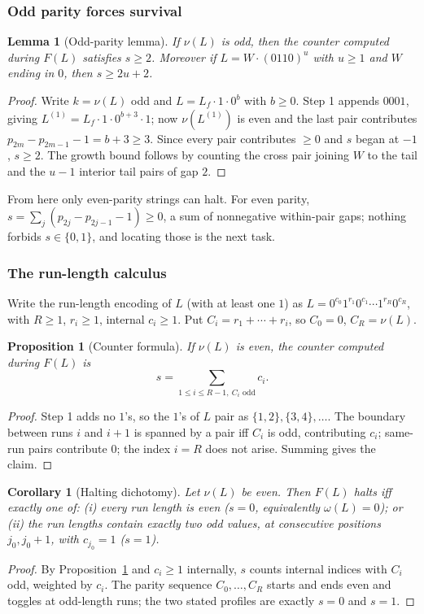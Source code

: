 \documentclass[a4paper]{article}
\theoremstyle{plain}
\newtheorem{proposition}{Proposition}[subsection]
\newtheorem{lemma}{Lemma}[subsection]
\newtheorem{corollary}{Corollary}[subsection]
\theoremstyle{definition}
\theoremstyle{remark}
\begin{document}
\subsubsection{Odd parity forces survival}\label{b2:sec:odd}
\begin{lemma}[Odd-parity lemma]\label{b2:lem:odd}
If $\nu(L)$ is odd, then the counter computed during $F(L)$ satisfies $s\ge 2$. Moreover if $L=W\cdot(0110)^u$ with $u\ge 1$ and $W$ ending in $0$, then $s\ge 2u+2$.
\end{lemma}
\begin{proof}
Write $k=\nu(L)$ odd and $L=L_f\cdot 1\cdot 0^b$ with $b\ge 0$. Step 1 appends $0001$, giving $L^{(1)}=L_f\cdot 1\cdot 0^{b+3}\cdot 1$; now $\nu(L^{(1)})$ is even and the last pair contributes $p_{2m}-p_{2m-1}-1=b+3\ge 3$. Since every pair contributes $\ge 0$ and $s$ began at $-1$, $s\ge 2$. The growth bound follows by counting the cross pair joining $W$ to the tail and the $u-1$ interior tail pairs of gap $2$.
\end{proof}

From here only even-parity strings can halt. For even parity, $s=\sum_j(p_{2j}-p_{2j-1}-1)\ge 0$, a sum of nonnegative within-pair gaps; nothing forbids $s\in\{0,1\}$, and locating those is the next task.

\subsubsection{The run-length calculus}\label{b2:sec:rl}
Write the run-length encoding of $L$ (with at least one $1$) as $L=0^{c_0}1^{r_1}0^{c_1}\cdots 1^{r_R}0^{c_R}$, with $R\ge 1$, $r_i\ge 1$, internal $c_i\ge 1$. Put $C_i=r_1+\cdots+r_i$, so $C_0=0$, $C_R=\nu(L)$.

\begin{proposition}[Counter formula]\label{b2:prop:counter}
If $\nu(L)$ is even, the counter computed during $F(L)$ is
\[ s=\sum_{1\le i\le R-1,\ C_i\text{ odd}} c_i. \]
\end{proposition}
\begin{proof}
Step 1 adds no $1$'s, so the $1$'s of $L$ pair as $\{1,2\},\{3,4\},\dots$. The boundary between runs $i$ and $i+1$ is spanned by a pair iff $C_i$ is odd, contributing $c_i$; same-run pairs contribute $0$; the index $i=R$ does not arise. Summing gives the claim.
\end{proof}

\begin{corollary}[Halting dichotomy]\label{b2:cor:halting}
Let $\nu(L)$ be even. Then $F(L)$ halts iff exactly one of: (i) every run length is even ($s=0$, equivalently $\omega(L)=0$); or (ii) the run lengths contain exactly two odd values, at consecutive positions $j_0,j_0+1$, with $c_{j_0}=1$ ($s=1$).
\end{corollary}
\begin{proof}
By Proposition~\ref{b2:prop:counter} and $c_i\ge 1$ internally, $s$ counts internal indices with $C_i$ odd, weighted by $c_i$. The parity sequence $C_0,\dots,C_R$ starts and ends even and toggles at odd-length runs; the two stated profiles are exactly $s=0$ and $s=1$.
\end{proof}
\end{document}
